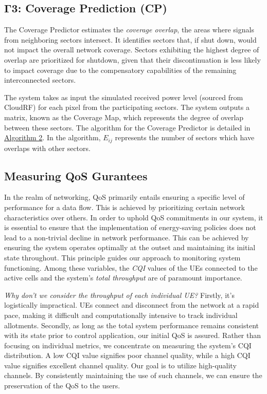 \subsection{$\boldsymbol{\Gamma3}$: Coverage Prediction (CP)}

The Coverage Predictor estimates the \textit{coverage overlap}, the areas where signals from neighboring sectors intersect.
It identifies sectors that, if shut down, would not impact the overall network coverage.
Sectors exhibiting the highest degree of overlap are prioritized for shutdown, given that their discontinuation is less likely to impact coverage due to the compensatory capabilities of the remaining interconnected sectors.

The system takes as input the simulated received power level (sourced from CloudRF) for each pixel from the participating sectors. 
The system outputs a matrix, known as the Coverage Map, which represents the degree of overlap between these sectors. 
The algorithm for the Coverage Predictor is detailed in \hyperref[alg:coverage_algo]{Algorithm 2}.
In the algorithm, $E_{ij}$ represents the number of sectors which have overlaps with other sectors.

  

\subsection{Measuring QoS Gurantees}

In the realm of networking, QoS primarily entails ensuring a specific level of performance for a data flow. 
This is achieved by prioritizing certain network characteristics over others. %
In order to uphold QoS commitments in our system, it is essential to ensure that the implementation of energy-saving policies does not lead to a non-trivial decline in network performance.
This can be achieved by ensuring the system operates optimally at the outset and maintaining its initial state throughout. This principle guides our approach to monitoring system functioning.
Among these variables, the \textit{CQI} values of the UEs connected to the active cells and the system's \textit{total throughput} are of paramount importance.

\textit{Why don't we consider the throughput of each individual UE?} Firstly, it's logistically impractical. 
UEs connect and disconnect from the network at a rapid pace, making it difficult and computationally intensive to track individual allotments.
Secondly, as long as the total system performance remains consistent with its state prior to control application, our initial QoS is assured.
Rather than focusing on individual metrics, we concentrate on measuring the system's CQI distribution. 
A low CQI value signifies poor channel quality, while a high CQI value signifies excellent channel quality. 
Our goal is to utilize high-quality channels. By consistently maintaining the use of such channels, we can ensure the preservation of the QoS to the users.

